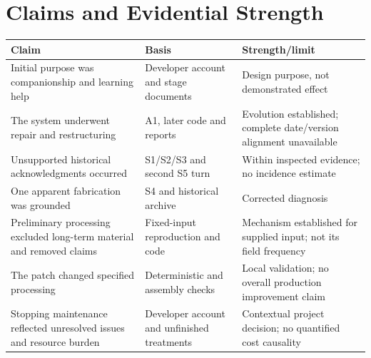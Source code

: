 \documentclass[11pt,a4paper]{article}
\begin{document}
\clearpage
\section{Claims and Evidential Strength}\label{app:claims}
\small
\begin{longtable}{P{.36\linewidth}P{.26\linewidth}P{.28\linewidth}}
\toprule
Claim & Basis & Strength/limit \\
\midrule\endhead
Initial purpose was companionship and learning help & Developer account and stage documents & Design purpose, not demonstrated effect \\
The system underwent repair and restructuring & A1, later code and reports & Evolution established; complete date/version alignment unavailable \\
Unsupported historical acknowledgments occurred & S1/S2/S3 and second S5 turn & Within inspected evidence; no incidence estimate \\
One apparent fabrication was grounded & S4 and historical archive & Corrected diagnosis \\
Preliminary processing excluded long-term material and removed claims & Fixed-input reproduction and code & Mechanism established for supplied input; not its field frequency \\
The patch changed specified processing & Deterministic and assembly checks & Local validation; no overall production improvement claim \\
Stopping maintenance reflected unresolved issues and resource burden & Developer account and unfinished treatments & Contextual project decision; no quantified cost causality \\
\bottomrule
\end{longtable}
\normalsize
\end{document}
